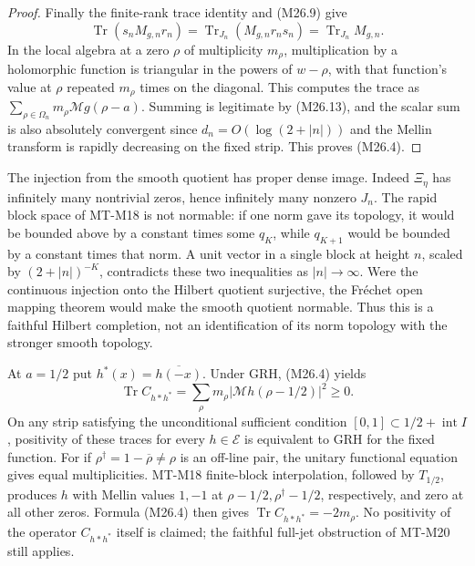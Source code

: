 \documentclass[11pt,a4paper]{article}
\begin{document}
\begin{proof}
Finally the finite-rank trace identity and (M26.9) give
\[
 \operatorname{Tr}(s_nM_{g,n}r_n)
       =\operatorname{Tr}_{J_n}(M_{g,n}r_ns_n)
       =\operatorname{Tr}_{J_n}M_{g,n}.
\]
In the local algebra at a zero $\rho$ of multiplicity
$m_\rho$, multiplication by a holomorphic function is
triangular in the powers of $w-\rho$, with that function's
value at $\rho$ repeated $m_\rho$ times on the diagonal.
This computes the trace as
$\sum_{\rho\in\Omega_n}m_\rho\mathcal Mg(\rho-a)$.
Summing is legitimate by (M26.13), and the scalar sum
is also absolutely convergent since $d_n=O(\log(2+|n|))$
and the Mellin transform is rapidly decreasing on the
fixed strip. This proves (M26.4).
\end{proof}

The injection from the smooth quotient has proper dense
image. Indeed $\Xi_\eta$ has infinitely many nontrivial
zeros, hence infinitely many nonzero $J_n$. The rapid
block space of MT-M18 is not normable: if one norm gave
its topology, it would be bounded above by a constant
times some $q_K$, while $q_{K+1}$ would be bounded by
a constant times that norm. A unit vector in a single
block at height $n$, scaled by $(2+|n|)^{-K}$, contradicts
these two inequalities as $|n|\to\infty$. Were the
continuous injection onto the Hilbert quotient surjective,
the Fr\'echet open mapping theorem would make the smooth
quotient normable. Thus this is a faithful Hilbert
completion, not an identification of its norm topology
with the stronger smooth topology.

At $a=1/2$ put $h^*(x)=\overline{h(-x)}$. Under GRH,
(M26.4) yields
\[
 \operatorname{Tr}C_{h*h^*}
      =\sum_\rho m_\rho|\mathcal Mh(\rho-1/2)|^2\ge0.
                                                               \tag{M26.15}
\]
On any strip satisfying the unconditional sufficient
condition $[0,1]\subset1/2+\operatorname{int}I$, positivity
of these traces for every $h\in\mathcal E$ is equivalent
to GRH for the fixed function. For if
$\rho^\dagger=1-\overline\rho\ne\rho$ is an off-line pair,
the unitary functional equation gives equal multiplicities.
MT-M18 finite-block interpolation, followed by $T_{1/2}$,
produces $h$ with Mellin values $1,-1$ at
$\rho-1/2,\rho^\dagger-1/2$, respectively, and zero at
all other zeros. Formula (M26.4) then gives
$\operatorname{Tr}C_{h*h^*}=-2m_\rho$.
No positivity of the operator $C_{h*h^*}$ itself is claimed;
the faithful full-jet obstruction of MT-M20 still applies.
\end{document}
